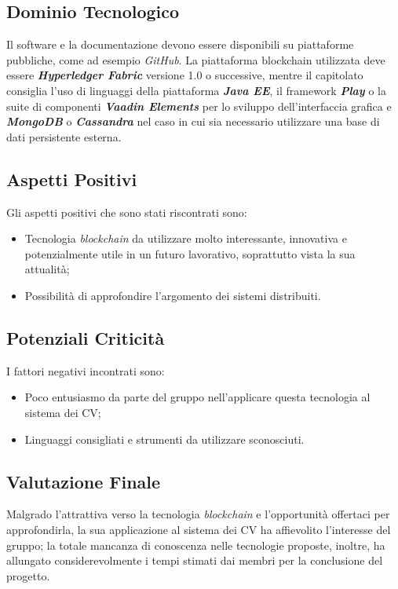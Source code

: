 \subsection{Dominio Tecnologico}
	Il software e la documentazione devono essere disponibili su piattaforme pubbliche, come ad esempio \textit{GitHub}{}. La piattaforma blockchain utilizzata deve essere \textit{\textbf{Hyperledger Fabric}} versione 1.0 o successive, mentre il capitolato consiglia l'uso di linguaggi della piattaforma \textit{\textbf{Java EE}}, il framework \textit{\textbf{Play}} o la suite di componenti \textit{\textbf{Vaadin Elements}} per lo sviluppo dell'interfaccia grafica e \textit{\textbf{MongoDB}} o \textit{\textbf{Cassandra}} nel caso in cui sia necessario utilizzare una base di dati persistente esterna.
	
\subsection{Aspetti Positivi}
	Gli aspetti positivi che sono stati riscontrati sono:
	\begin{itemize}
		\item Tecnologia \textit{blockchain} da utilizzare molto interessante, innovativa e potenzialmente utile in un futuro lavorativo,
		soprattutto vista la sua attualità;
		\item Possibilità di approfondire l'argomento dei sistemi distribuiti.
	\end{itemize}

\subsection{Potenziali Criticità}
	I fattori negativi incontrati sono:
	\begin{itemize}
		\item Poco entusiasmo da parte del gruppo nell'applicare questa tecnologia al sistema dei CV;
		\item Linguaggi consigliati e strumenti da utilizzare sconosciuti.
	\end{itemize}

\subsection{Valutazione Finale}
	Malgrado l'attrattiva verso la tecnologia \textit{blockchain} e l'opportunità offertaci per approfondirla, la sua applicazione al sistema dei CV ha affievolito l'interesse del gruppo; la totale mancanza di conoscenza nelle tecnologie proposte, inoltre, ha allungato considerevolmente i tempi stimati dai membri per la conclusione del progetto.